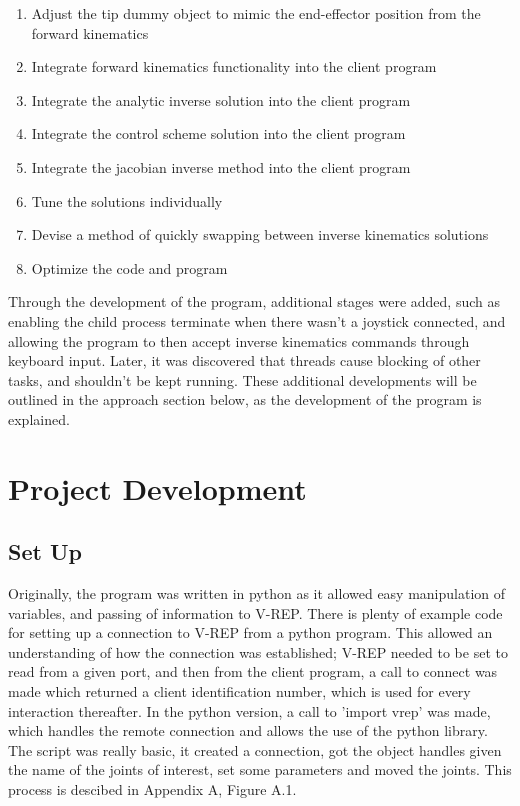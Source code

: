 \documentclass[12pt,openany,a4paper]{book}
\begin{document}
\begin{enumerate}
  \item Adjust the tip dummy object to mimic the end-effector position from the forward kinematics
  \item Integrate forward kinematics functionality into the client program
  \item Integrate the analytic inverse solution into the client program
  \item Integrate the control scheme solution into the client program
  \item Integrate the jacobian inverse method into the client program
  \item	Tune the solutions individually
  \item Devise a method of quickly swapping between inverse kinematics solutions
  \item Optimize the code and program

\end{enumerate}

Through the development of the program, additional stages were added, such as enabling the child process terminate when there wasn't a joystick connected, and allowing the program to then accept inverse kinematics commands through keyboard input. Later, it was discovered that threads cause blocking of other tasks, and shouldn't be kept running. These additional developments will be outlined in the approach section below, as the development of the program is explained. 

\section{Project Development}

\subsection{Set Up}
Originally, the program was written in python as it allowed easy manipulation of variables, and passing of information to V-REP. There is plenty of example code for setting up a connection to V-REP from a python program. This allowed an understanding of how the connection was established; V-REP needed to be set to read from a given port, and then from the client program, a call to connect was made which returned a client identification number, which is used for every interaction thereafter. In the python version, a call to 'import vrep' was made, which handles the remote connection and allows the use of the python library. The script was really basic, it created a connection, got the object handles given the name of the joints of interest, set some parameters and moved the joints. This process is descibed in Appendix A, Figure A.1.
\end{document}
